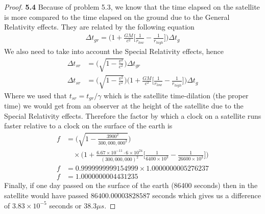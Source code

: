 \documentclass[11pt]{article}
\theoremstyle{definition}
\begin{document}
\begin{proof}{\textbf{5.4}}
    Because of problem 5.3, we know that the time elapsed on the satellite
    is more compared to the time elapsed on the ground due to the General
    Relativity effects. They are related by the following equation
    \begin{align*}
        \Delta t_{gr} =
        \bigg(1 + \frac{GM}{c^2} \bigg[\frac{1}{r_{low}} - \frac{1}{r_{high}}\bigg]\bigg)
        \Delta t_g
    \end{align*}
    We also need to take into account the Special Relativity effects, hence
    \begin{align*}
        \Delta t_{sr} &= \bigg(\sqrt{1 - \frac{v^2}{c^2}}\bigg)\Delta t_{gr}\\
        \Delta t_{sr} &=
        \bigg(\sqrt{1 - \frac{v^2}{c^2}}\bigg)
        \bigg(1 + \frac{GM}{c^2} \bigg[\frac{1}{r_{low}} - \frac{1}{r_{high}}\bigg]\bigg)
        \Delta t_g
    \end{align*}
    Where we used that $t_{sr} = t_{gr}/\gamma$ which is the satellite
    time-dilation (the proper time) we would get from an observer
    at the height of the satellite due to the Special Relativity effects.
    Therefore the factor by which a clock on a satellite runs faster
    relative to a clock on the surface of the earth is
    \begin{align*}
        f &=
        \bigg(\sqrt{1 - \frac{3900^2}{300,000,000^2}}\bigg)\\
        &\quad\times\bigg(1 +
        \frac{6.67 \times10^{-11} \cdot 6 \times 10^{24}}{(300,000,000)^2}
        \bigg[\frac{1}{6400\times10^3} - \frac{1}{26600\times10^3}\bigg]\bigg)\\
        f &= 0.9999999999154999 \times 1.0000000005276237\\
        f &= 1.0000000004431235
    \end{align*}
    Finally, if one day passed on the surface of the earth (86400 seconds)
    then in the satellite would have passed $86400.00003828587$ seconds
    which gives us a difference of $3.83 \times 10^{-5}$ seconds or
    $38.3 \mu s$.
\end{proof}
\cleardoublepage
\end{document}
